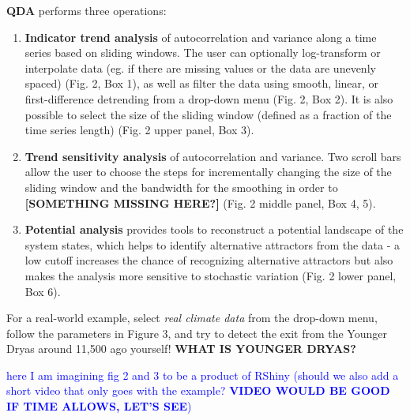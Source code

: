 \documentclass[12pt,a4paper,final]{article}
\begin{document}
\textbf{QDA} performs three operations:
\begin{enumerate}
\item \textbf{Indicator trend analysis} of autocorrelation and variance along a time series based on sliding windows. The user can optionally log-transform or interpolate data (eg. if there are missing values or the data are unevenly spaced) (Fig. 2, Box 1), as well as filter the data using smooth, linear, or first-difference detrending from a drop-down menu (Fig. 2, Box 2). It is also possible to select the size of the sliding window (defined as a fraction of the time series length) (Fig. 2 upper panel, Box 3).
\item \textbf{Trend sensitivity analysis} of autocorrelation and variance. Two scroll bars allow the user to choose the steps for incrementally changing the size of the sliding window and the bandwidth for the smoothing in order to {\bf [SOMETHING MISSING HERE?]} (Fig. 2 middle panel, Box 4, 5). 
\item \textbf{Potential analysis} provides tools to reconstruct a potential landscape of the system states, which helps to identify alternative attractors from the data - a low cutoff increases the chance of recognizing alternative attractors but also makes the analysis more sensitive to stochastic variation (Fig. 2 lower panel, Box 6).
\end{enumerate}

For a real-world example, select \textit{real climate data} from the drop-down menu, follow the parameters in Figure 3, and try to detect the exit from the Younger Dryas around 11,500 ago yourself! {\bf WHAT IS YOUNGER DRYAS?}

\textcolor{blue}{here I am imagining fig 2 and 3 to be a product of RShiny (should we also add a short video that only goes with the example? {\bf VIDEO WOULD BE GOOD IF TIME ALLOWS, LET'S SEE})}
\end{document}
